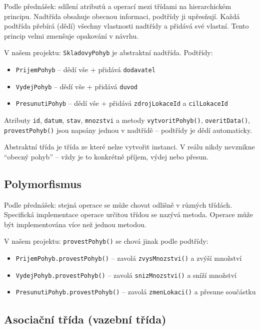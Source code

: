 \documentclass[12pt, a4paper]{article}
\begin{document}
Podle přednášek: sdílení atributů a operací mezi třídami na hierarchickém principu. Nadtřída obsahuje obecnou informaci, podtřídy ji upřesňují. Každá podtřída přebírá (dědí) všechny vlastnosti nadtřídy a přidává své vlastní. Tento princip velmi zmenšuje opakování v návrhu.

V našem projektu: \texttt{SkladovyPohyb} je abstraktní nadtřída. Podtřídy:
\begin{itemize}
  \item \texttt{PrijemPohyb} -- dědí vše + přidává \texttt{dodavatel}
  \item \texttt{VydejPohyb} -- dědí vše + přidává \texttt{duvod}
  \item \texttt{PresunutiPohyb} -- dědí vše + přidává \texttt{zdrojLokaceId} a \texttt{cilLokaceId}
\end{itemize}

Atributy \texttt{id}, \texttt{datum}, \texttt{stav}, \texttt{mnozstvi} a metody \texttt{vytvoritPohyb()}, \texttt{overitData()}, \texttt{provestPohyb()} jsou napsány jednou v nadtřídě -- podtřídy je dědí automaticky.

Abstraktní třída je třída ze které nelze vytvořit instanci. V reálu nikdy nevznikne ``obecný pohyb'' -- vždy je to konkrétně příjem, výdej nebo přesun.

\subsection{Polymorfismus}

Podle přednášek: stejná operace se může chovat odlišně v různých třídách. Specifická implementace operace určitou třídou se nazývá metoda. Operace může být implementována více než jednou metodou.

V našem projektu: \texttt{provestPohyb()} se chová jinak podle podtřídy:
\begin{itemize}
  \item \texttt{PrijemPohyb.provestPohyb()} -- zavolá \texttt{zvysMnozstvi()} a zvýší množství
  \item \texttt{VydejPohyb.provestPohyb()} -- zavolá \texttt{snizMnozstvi()} a sníží množství
  \item \texttt{PresunutiPohyb.provestPohyb()} -- zavolá \texttt{zmenLokaci()} a přesune součástku
\end{itemize}

\subsection{Asociační třída (vazební třída)}
\end{document}
